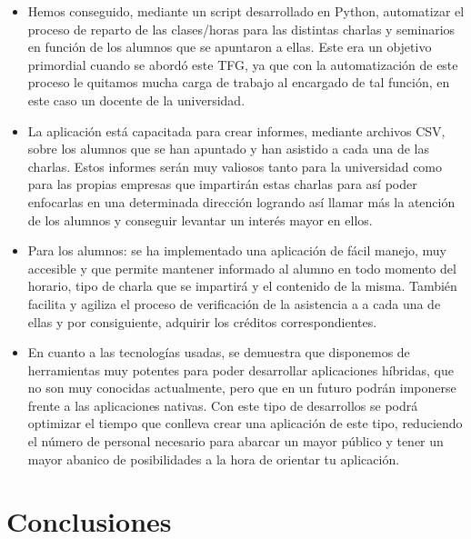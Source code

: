 \documentclass[a4paper, 12pt]{book}
\begin{document}
\begin{itemize}
  \item Hemos conseguido, mediante un script desarrollado en Python, automatizar el proceso de reparto de las clases/horas para las distintas charlas y seminarios en función de los alumnos que se apuntaron a ellas. Este era un objetivo primordial cuando se abordó este TFG, ya que con la automatización de este proceso le quitamos mucha carga de trabajo al encargado de tal función, en este caso un docente de la universidad.
  
  \item La aplicación está capacitada para crear informes, mediante archivos CSV, sobre los alumnos que se han apuntado y han asistido a cada una de las charlas. Estos informes serán muy valiosos tanto para la universidad como para las propias empresas que impartirán estas charlas para así poder enfocarlas en una determinada dirección logrando así llamar más la atención de los alumnos y conseguir levantar un interés mayor en ellos.
   
   \item Para los alumnos: se ha implementado una aplicación de fácil manejo, muy accesible y que permite mantener informado al alumno en todo momento del horario, tipo de charla que se impartirá y el contenido de la misma. También facilita y agiliza el proceso de verificación de la asistencia a a cada una de ellas y por consiguiente, adquirir los créditos correspondientes.
   
   \item En cuanto a las tecnologías usadas, se demuestra que disponemos de herramientas muy potentes para poder desarrollar aplicaciones híbridas, que no son muy conocidas actualmente, pero que en un futuro podrán imponerse frente a las aplicaciones nativas. Con este tipo de desarrollos se podrá optimizar el tiempo que conlleva crear una aplicación de este tipo, reduciendo el número de personal necesario para abarcar un mayor público y tener un mayor abanico de posibilidades a la hora de orientar tu aplicación.
\end{itemize}



\cleardoublepage
\chapter{Conclusiones}
\label{chap:conclusiones}
\end{document}

